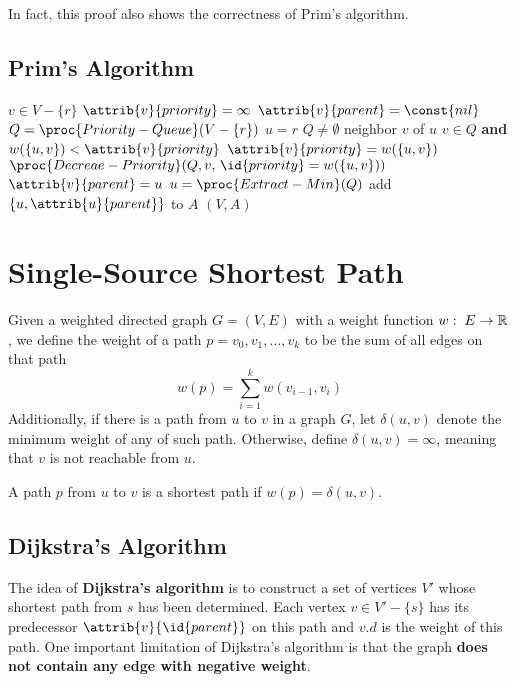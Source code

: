 In fact, this proof also shows the correctness of Prim's algorithm.

\subsection{Prim's Algorithm} 

\begin{codebox}
    \li \For $v \in V - \{r\}$ \Do
        \li $\attrib{v}{priority} = \infty$
        \li $\attrib{v}{parent} = \const{nil}$ \End
    \li $Q = \proc{Priority-Queue}(V-\{r\})$
    \li $u = r$ 
    \li \While $Q \neq \emptyset$ \Do
        \li \For neighbor $v$ of $u$ \Do
            \li \If $v \in Q$ \textbf{and} $w(\{u,v\}) < \attrib{v}{priority}$ \Then
                \li $\attrib{v}{priority} = w(\{u,v\})$
                \li $\proc{Decreae-Priority}(Q,v,\, \id{priority}=w(\{u,v\}))$ 
                \li $\attrib{v}{parent} = u$ \End
            \End
        \li $u = \proc{Extract-Min}(Q)$
        \li add $\{u,\attrib{u}{parent}\}$ to $A$
        \End
    \li \Return $(V,A)$ 
\end{codebox}

\section{Single-Source Shortest Path}

Given a weighted directed graph $G=(V,E)$ with a weight function $w:\; E \to \mathbb{R}$, we define the weight of a path $p = v_0,v_1,\ldots,v_k$ to be the sum of all edges on that path
$$
w(p) = \sum_{i=1}^k w(v_{i-1},v_i)
$$
Additionally, if there is a path from $u$ to $v$ in a graph $G$, let $\delta(u,v)$ denote the minimum weight of any of such path. Otherwise, define $\delta(u,v) = \infty$, meaning that $v$ is not reachable from $u$. 

A path $p$ from $u$ to $v$ is a shortest path if $w(p) = \delta(u,v)$.

\subsection{Dijkstra's Algorithm} 

The idea of \textbf{Dijkstra's algorithm} is to construct a set of vertices $V'$ whose shortest path from $s$ has been determined. Each vertex $v \in V' - \{s\}$ has its predecessor $\attrib{v}{\id{parent}}$ on this path and $v.d$ is the weight of this path. One important limitation of Dijkstra's algorithm is that the graph \textbf{does not contain any edge with negative weight}.

